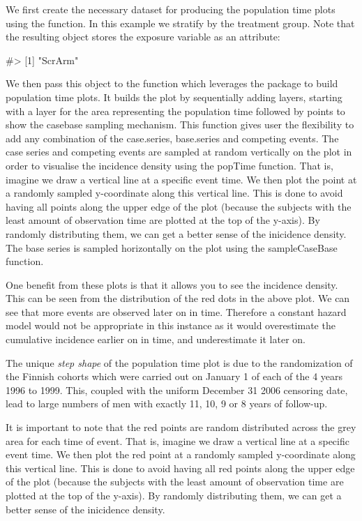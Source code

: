 \documentclass[
]{jss}
\begin{document}
We first create the necessary dataset for producing the population time
plots using the  function. In this example we
stratify by the treatment group. Note that the resulting object stores
the exposure variable as an attribute:

\begin{CodeChunk}

\begin{CodeOutput}
#> [1] "ScrArm"
\end{CodeOutput}
\end{CodeChunk}

We then pass this object to the  function which leverages the
 package \citep{ggplot2} to build population time plots. It
builds the plot by sequentially adding layers, starting with a layer for
the area representing the population time followed by points to show the
casebase sampling mechanism. This function gives user the flexibility to
add any combination of the case.series, base.series and competing
events. The case series and competing events are sampled at random
vertically on the plot in order to visualise the incidence density using
the popTime function. That is, imagine we draw a vertical line at a
specific event time. We then plot the point at a randomly sampled
y-coordinate along this vertical line. This is done to avoid having all
points along the upper edge of the plot (because the subjects with the
least amount of observation time are plotted at the top of the y-axis).
By randomly distributing them, we can get a better sense of the
inicidence density. The base series is sampled horizontally on the plot
using the sampleCaseBase function.

One benefit from these plots is that it allows you to see the incidence
density. This can be seen from the distribution of the red dots in the
above plot. We can see that more events are observed later on in time.
Therefore a constant hazard model would not be appropriate in this
instance as it would overestimate the cumulative incidence earlier on in
time, and underestimate it later on.

The unique \emph{step shape} of the population time plot is due to the
randomization of the Finnish cohorts which were carried out on January 1
of each of the 4 years 1996 to 1999. This, coupled with the uniform
December 31 2006 censoring date, lead to large numbers of men with
exactly 11, 10, 9 or 8 years of follow-up.

It is important to note that the red points are random distributed
across the grey area for each time of event. That is, imagine we draw a
vertical line at a specific event time. We then plot the red point at a
randomly sampled y-coordinate along this vertical line. This is done to
avoid having all red points along the upper edge of the plot (because
the subjects with the least amount of observation time are plotted at
the top of the y-axis). By randomly distributing them, we can get a
better sense of the inicidence density.
\end{document}
